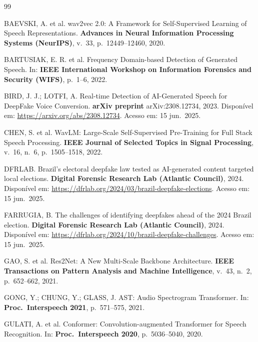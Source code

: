 \documentclass[12pt,a4paper]{article}
\begin{document}
\begin{thebibliography}{99}

BAEVSKI, A. et al.
wav2vec 2.0: A Framework for Self-Supervised Learning of Speech
Representations.
\textbf{Advances in Neural Information Processing Systems (NeurIPS)},
v.~33, p.~12449--12460, 2020.

BARTUSIAK, E. R. et al.
Frequency Domain-based Detection of Generated Speech.
In: \textbf{IEEE International Workshop on Information Forensics and Security
(WIFS)}, p.~1--6, 2022.

BIRD, J. J.; LOTFI, A.
Real-time Detection of AI-Generated Speech for DeepFake Voice Conversion.
\textbf{arXiv preprint} arXiv:2308.12734, 2023.
Dispon\'{i}vel em: \url{https://arxiv.org/abs/2308.12734}.
Acesso em: 15 jun.\ 2025.

CHEN, S. et al.
WavLM: Large-Scale Self-Supervised Pre-Training for Full Stack Speech
Processing.
\textbf{IEEE Journal of Selected Topics in Signal Processing},
v.~16, n.~6, p.~1505--1518, 2022.

DFRLAB.
Brazil's electoral deepfake law tested as AI-generated content targeted local
elections.
\textbf{Digital Forensic Research Lab (Atlantic Council)}, 2024.
Dispon\'{i}vel em: \url{https://dfrlab.org/2024/03/brazil-deepfake-elections}.
Acesso em: 15 jun.\ 2025.

FARRUGIA, B.
The challenges of identifying deepfakes ahead of the 2024 Brazil election.
\textbf{Digital Forensic Research Lab (Atlantic Council)}, 2024.
Dispon\'{i}vel em: \url{https://dfrlab.org/2024/10/brazil-deepfake-challenges}.
Acesso em: 15 jun.\ 2025.

GAO, S. et al.
Res2Net: A New Multi-Scale Backbone Architecture.
\textbf{IEEE Transactions on Pattern Analysis and Machine Intelligence},
v.~43, n.~2, p.~652--662, 2021.

GONG, Y.; CHUNG, Y.; GLASS, J.
AST: Audio Spectrogram Transformer.
In: \textbf{Proc.\ Interspeech 2021}, p.~571--575, 2021.

GULATI, A. et al.
Conformer: Convolution-augmented Transformer for Speech Recognition.
In: \textbf{Proc.\ Interspeech 2020}, p.~5036--5040, 2020.


\end{thebibliography}
\end{document}
